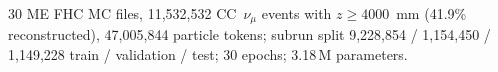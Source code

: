 30 ME FHC MC files, 11{,}532{,}532 CC~$\nu_\mu$ events with $z \ge 4000$~mm (41.9\% reconstructed), 47{,}005{,}844 particle tokens; subrun split 9{,}228{,}854 / 1{,}154{,}450 / 1{,}149{,}228 train / validation / test; 30 epochs; 3.18\,M parameters.
